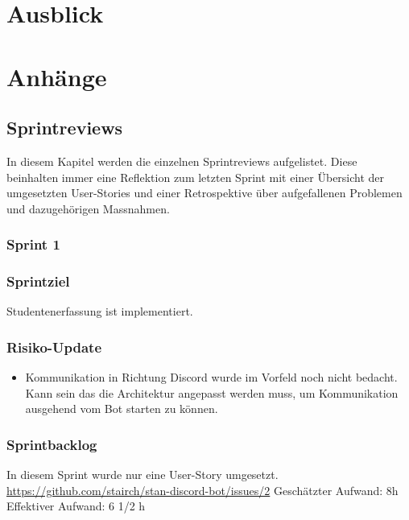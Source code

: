 \documentclass[a4paper, table]{article}
\begin{document}


\newpage
\section{Ausblick}


\newpage

\section{Anh\"ange}

\subsection{Sprintreviews}\label{Sprintreviews}
In diesem Kapitel werden die einzelnen Sprintreviews aufgelistet.
Diese beinhalten immer eine Reflektion zum letzten Sprint mit einer Übersicht der umgesetzten User-Stories und
einer Retrospektive über aufgefallenen Problemen und dazugehörigen Massnahmen.

\subsubsection{Sprint 1}
\subsubsection*{Sprintziel}
Studentenerfassung ist implementiert.

\subsubsection*{Risiko-Update}
\begin{itemize}
    \item Kommunikation in Richtung Discord wurde im Vorfeld noch nicht bedacht.
    Kann sein das die Architektur angepasst werden muss, um Kommunikation ausgehend vom Bot starten zu können.
\end{itemize}

\subsubsection*{Sprintbacklog}
In diesem Sprint wurde nur eine User-Story umgesetzt.\\
\url{https://github.com/stairch/stan-discord-bot/issues/2}
\newline
Geschätzter Aufwand: 8h
\newline
Effektiver Aufwand: 6 1/2 h
\end{document}
